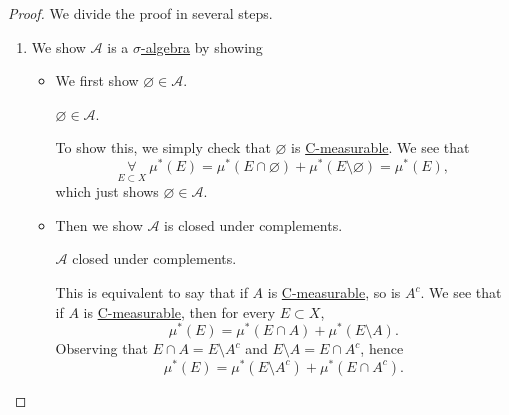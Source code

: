 \begin{proof}\let\qed\relax
	We divide the proof in several steps.
	\begin{enumerate}[(1)]
		\item We show \(\mathcal{A}\) is a \hyperref[def:sigma-algebra]{\(\sigma\)-algebra} by showing
		      \begin{itemize}
			      \item We first show \(\varnothing \in \mathcal{A} \).
			            \begin{claim}
				            \(\varnothing \in \mathcal{A} \).
			            \end{claim}
			            \begin{explanation}
				            To show this, we simply check that \(\varnothing \) is \hyperref[def:C-measurable]{C-measurable}. We see that
				            \[
					            \underset{E\subset X}{\forall}\ \mu^{\ast} (E) = \mu^{\ast} (E\cap \varnothing ) + \mu^{\ast} (E \setminus \varnothing ) = \mu^{\ast} (E),
				            \]
				            which just shows \(\varnothing \in \mathcal{A}\).
			            \end{explanation}
			      \item Then we show \(\mathcal{A} \) is closed under complements.
			            \begin{claim}
				            \(\mathcal{A} \) closed under complements.
			            \end{claim}
			            \begin{explanation}
				            This is equivalent to say that if \(A\) is \hyperref[def:C-measurable]{C-measurable}, so is \(A^{c}\).
				            We see that if \(A\) is \hyperref[def:C-measurable]{C-measurable}, then for every \(E\subset X\),
				            \[
					            \mu^{\ast} (E) = \mu^{\ast} (E\cap A) + \mu^{\ast} (E\setminus A).
				            \]
				            Observing that \(E\cap A = E\setminus A^{c} \) and \(E\setminus A = E\cap A^{c} \), hence
				            \[
					            \mu^{\ast} (E) = \mu^{\ast} (E\setminus A^{c} ) + \mu^{\ast} (E\cap A^{c} ).
				            \]


\end{explanation}
\end{itemize}
\end{enumerate}
\end{proof}
